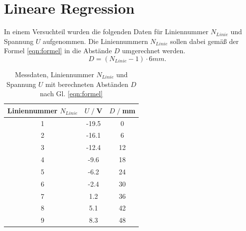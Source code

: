 \section{Lineare Regression}
    In einem Versuchteil wurden die folgenden Daten für Liniennummer $N_{Linie}$
    und Spannung $U$ aufgenommen.
    Die Liniennummern $N_{Linie}$ sollen dabei gemäß der Formel \ref{eqn:formel} in die Abstände $D$ umgerechnet werden. 
    \begin{equation}
        D=(N_{Linie}-1) \cdot 6 \si{mm.}
        \label{eqn:formel}
    \end{equation}

    \begin{table}[H]
        \centering
        \begin{tabular}{c c c}
            \toprule
            Liniennummer $N_{Linie}$ & $U\;/\;$V & $D\;/\;$mm \\
            \midrule
            1&-19.5&0\\
            2&-16.1&6\\
            3&-12.4&12\\
            4&-9.6&18\\
            5&-6.2&24\\
            6&-2.4&30\\
            7&1.2&36\\
            8&5.1&42\\
            9&8.3&48\\
            \bottomrule
        \end{tabular}
        \caption{Messdaten, Liniennummer $N_{Linie}$ und Spannung $U$ mit berechneten
            Abständen $D$ nach Gl. \ref{eqn:formel}}
        \label{tab:tabelle}
    \end{table}

